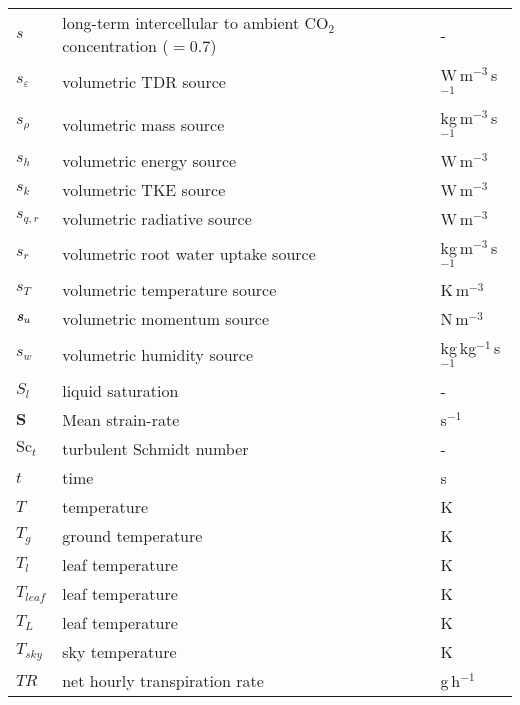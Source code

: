 \begin{longtable}{p{}p{}p{}}
	$s$ & long-term intercellular to ambient CO$_2$ concentration ($=0.7$) & - \\ 
	$s_{\varepsilon}$ & volumetric TDR source & W\,m$^{-3}$\,s$^{-1}$ \\ 		
	$s_{\rho}$ & volumetric mass source & kg\,m$^{-3}$\,s$^{-1}$ \\ 
	$s_h$ & volumetric energy source & W\,m$^{-3}$ \\ 		
	$s_k$ & volumetric TKE source & W\,m$^{-3}$ \\ 		
	$s_{q,r}$ & volumetric radiative source & W\,m$^{-3}$ \\ 		
	$s_r$ & volumetric root water uptake source & kg\,m$^{-3}$\,s$^{-1}$ \\ 	
	$s_T$ & volumetric temperature source & K\,m$^{-3}$ \\ 		
	$\textbf{\textit{s}}_u$ & volumetric momentum source & N\,m$^{-3}$ \\ 	
	$s_w$ & volumetric humidity source & kg\,kg$^{-1}$\,s$^{-1}$ \\ 		
	$S_l$ & liquid saturation & - \\ 
	$\textbf{S}$ & Mean strain-rate &  s$^{-1}$\\ 				
	${\textrm{Sc}_t}$ & turbulent Schmidt number & - \\ 				
	$t$ & time & s \\ 
	$T$ & temperature & K  \\ 
	$T_{\textit{g}}$ & ground temperature & K  \\ 	
	$T_{l}$ & leaf temperature & K  \\ 	
	$T_{leaf}$ & leaf temperature & K  \\ 	
	$T_{L}$ & leaf temperature & K  \\ 	
	$T_{\textit{sky}}$ & sky temperature & K  \\ 		
	$\textit{TR}$ & net hourly transpiration rate & g\,h$^{-1}$  \\ 

\end{longtable}
